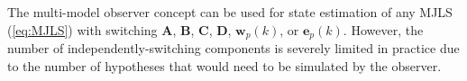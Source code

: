 %

The multi-model observer concept can be used for state estimation of any MJLS (\ref{eq:MJLS}) with switching $\mathbf{A}$, $\mathbf{B}$, $\mathbf{C}$, $\mathbf{D}$, $\mathbf{w}_p(k)$, or $\mathbf{e}_p(k)$. However, the number of independently-switching components is severely limited in practice due to the number of hypotheses that would need to be simulated by the observer.


